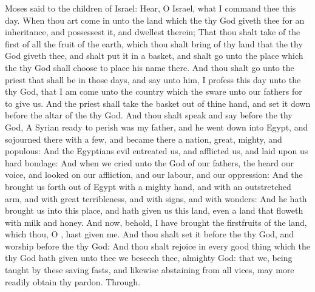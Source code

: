  Moses said to the children of Israel: Hear, O Israel, what I command thee this day. When thou art come in unto the land which the  thy God giveth thee for an inheritance, and possessest it, and dwellest therein; That thou shalt take of the first of all the fruit of the earth, which thou shalt bring of thy land that the  thy God giveth thee, and shalt put it in a basket, and shalt go unto the place which the  thy God shall choose to place his name there. And thou shalt go unto the priest that shall be in those days, and say unto him, I profess this day unto the  thy God, that I am come unto the country which the  sware unto our fathers for to give us. And the priest shall take the basket out of thine hand, and set it down before the altar of the  thy God. And thou shalt speak and say before the  thy God, A Syrian ready to perish was my father, and he went down into Egypt, and sojourned there with a few, and became there a nation, great, mighty, and populous: And the Egyptians evil entreated us, and afflicted us, and laid upon us hard bondage: And when we cried unto the  God of our fathers, the  heard our voice, and looked on our affliction, and our labour, and our oppression: And the  brought us forth out of Egypt with a mighty hand, and with an outstretched arm, and with great terribleness, and with signs, and with wonders: And he hath brought us into this place, and hath given us this land, even a land that floweth with milk and honey. And now, behold, I have brought the firstfruits of the land, which thou, O , hast given me. And thou shalt set it before the  thy God, and worship before the  thy God: And thou shalt rejoice in every good thing which the  thy God hath given unto thee
\collect
{} we beseech thee, almighty God: that we, being taught by these saving fasts, and likewise abstaining from all vices, may more readily obtain thy pardon. Through.
